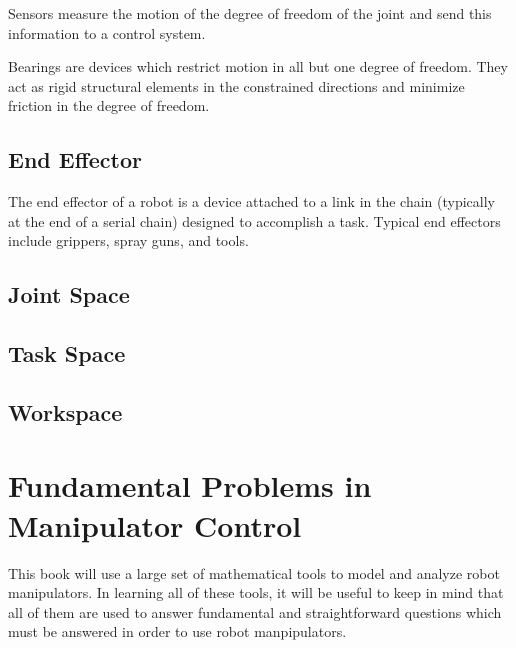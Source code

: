 Sensors measure the motion of the degree of freedom of the joint and send this information to a control system.

Bearings are devices which restrict motion in all but one degree of freedom. They act as rigid structural elements in the constrained directions and minimize friction in the degree of freedom.

\subsection{End Effector}

The end effector of a robot is a device attached to a link in the chain (typically at the end of a serial chain) designed to accomplish a task.  Typical end effectors include grippers, spray guns, and tools.

\subsection{Joint Space}
\subsection{Task Space}
\subsection{Workspace}


\section{Fundamental Problems in Manipulator Control}

This book will use a large set of mathematical tools to model and analyze robot manipulators.  In learning all of these tools, it will be useful to keep in mind that all of them are used to answer fundamental and straightforward questions which must be answered in order to use robot manpipulators. 

